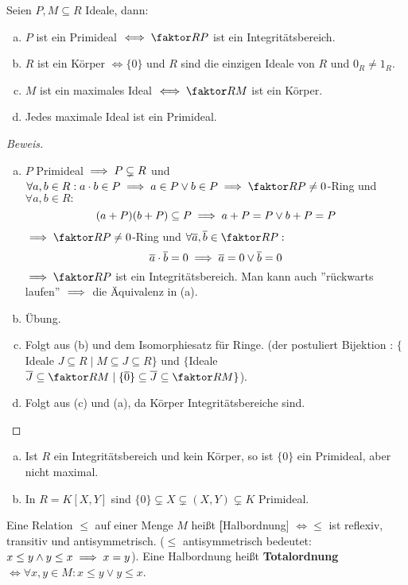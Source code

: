 \documentclass[a4paper]{report}
\begin{document}
\begin{prop}
  Seien $P, M \subseteq R$ Ideale, dann:
  \begin{enumerate}[(a)]
    \item $P$ ist ein Primideal $\iff \fak RP$ ist ein Integritätsbereich.
    \item $R$ ist ein Körper $\iff \{0\}$ und $R$ sind die einzigen Ideale von $R$ und $0_{R} \ne 1_{R}$.
    \item $M$ ist ein maximales Ideal $\iff \fak RM$ ist ein Körper.
    \item Jedes maximale Ideal ist ein Primideal.
  \end{enumerate}

  \begin{proof}[Beweis] \item
    \begin{enumerate}[(a)]
      \item $P$ Primideal $\implies P \subsetneq R$ und $\forall a, b \in R : a \cd b \in P \imp a \in P \vee b \in P \imp \fak RP \ne 0$-Ring und $\forall a, b \in R :$
      \[(a+P)(b + P) \subseteq P \implies a+P = P \vee b+P = P\]
      $\imp \fak RP \ne 0$-Ring und $\forall \bar a, \bar b \in \fak RP :$
      \[\overline a \cdot \overline b = 0 \implies \overline a = 0 \vee \overline b = 0\]
      $\imp \fak RP$ ist ein Integritätsbereich. Man kann auch ''rückwarts laufen'' $\implies$ die Äquivalenz in (a).
      \item Übung.
      \item Folgt aus (b) und dem Isomorphiesatz für Ringe. (der postuliert Bijektion : $\{$Ideale $J \subseteq R \mid M \subseteq J \subseteq R\}$ und $\{$Ideale $\bar J \subseteq \fak RM \mid \{\bar 0\} \subseteq \bar J \subseteq \fak RM\}$).
      \item Folgt aus (c) und (a), da Körper Integritätsbereiche sind. \qedhere
    \end{enumerate}
\end{proof}
\end{prop}
\begin{bsp}
  \begin{enumerate}[(a)]
    \item Ist $R$ ein Integritätsbereich und kein Körper, so ist $\{0\}$ ein Primideal, aber nicht maximal.
    \item In $R = K[X, Y]$ sind $\{0\} \subsetneq X \subsetneq (X, Y) \subsetneq K$ Primideal.
   \end{enumerate}
 \end{bsp}

 \begin{whg*}[Grundlagen]
   Eine Relation $\le$ auf einer Menge $M$ heißt \textbf[Halbordnung] $\iff \le$ ist reflexiv, transitiv und antisymmetrisch. ($\le$ antisymmetrisch bedeutet: $x \le y \wedge y \le x \implies x = y$). Eine Halbordnung heißt \textbf{Totalordnung} $\iff \forall x, y \in M : x \le y \vee y \le x$.
 \end{whg*}
\end{document}
